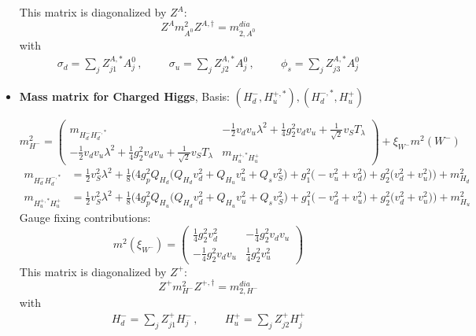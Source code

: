 \begin{itemize}
This matrix is diagonalized by \(Z^A\): 
\begin{equation} 
Z^A m^2_{A^0} Z^{A,\dagger} = m^{dia}_{2,A^0} 
\end{equation} 
with 
\begin{align} 
\sigma_{d} = \sum_{j}Z^{A,*}_{j 1}A^0_{{j}}\,, \hspace{1cm} 
\sigma_{u} = \sum_{j}Z^{A,*}_{j 2}A^0_{{j}}\,, \hspace{1cm} 
\phi_s = \sum_{j}Z^{A,*}_{j 3}A^0_{{j}}
\end{align} 
\item {\bf Mass matrix for Charged Higgs}, Basis: \( \left(H_d^-, H_u^{+,*}\right), \left(H_d^{-,*}, H_u^+\right) \) 
 
\begin{equation} 
m^2_{H^-} = \left( 
\begin{array}{cc}
m_{H_d^-H_d^{-,*}} &-\frac{1}{2} v_d v_u \lambda^{2}  + \frac{1}{4} g_{2}^{2} v_d v_u  + \frac{1}{\sqrt{2}} v_S T_{\lambda} \\ 
-\frac{1}{2} v_d v_u \lambda^{2}  + \frac{1}{4} g_{2}^{2} v_d v_u  + \frac{1}{\sqrt{2}} v_S T_{\lambda}  &m_{H_u^{+,*}H_u^+}\end{array} 
\right) +  \xi_{W^-}m^2(W^-) 
 \end{equation} 
\begin{align} 
m_{H_d^-H_d^{-,*}} &= \frac{1}{2} v_{S}^{2} \lambda^{2}  + \frac{1}{8} \Big(4 g_{p}^{2} Q_{H_d} \Big(Q_{H_d} v_{d}^{2}  + Q_{H_u} v_{u}^{2}  + Q_s v_{S}^{2} \Big) + g_{1}^{2} \Big(- v_{u}^{2}  + v_{d}^{2}\Big) + g_{2}^{2} \Big(v_{d}^{2} + v_{u}^{2}\Big)\Big) + m_{H_d}^2\\ 
m_{H_u^{+,*}H_u^+} &= \frac{1}{2} v_{S}^{2} \lambda^{2}  + \frac{1}{8} \Big(4 g_{p}^{2} Q_{H_u} \Big(Q_{H_d} v_{d}^{2}  + Q_{H_u} v_{u}^{2}  + Q_s v_{S}^{2} \Big) + g_{1}^{2} \Big(- v_{d}^{2}  + v_{u}^{2}\Big) + g_{2}^{2} \Big(v_{d}^{2} + v_{u}^{2}\Big)\Big) + m_{H_u}^2
\end{align} 
Gauge fixing contributions: 
\begin{equation} 
m^2 (\xi_{W^-}) = \left( 
\begin{array}{cc}
\frac{1}{4} g_{2}^{2} v_{d}^{2}  &-\frac{1}{4} g_{2}^{2} v_d v_u \\ 
-\frac{1}{4} g_{2}^{2} v_d v_u  &\frac{1}{4} g_{2}^{2} v_{u}^{2} \end{array} 
\right) 
 \end{equation} 
This matrix is diagonalized by \(Z^+\): 
\begin{equation} 
Z^+ m^2_{H^-} Z^{+,\dagger} = m^{dia}_{2,H^-} 
\end{equation} 
with 
\begin{align} 
H_d^- = \sum_{j}Z_{{j 1}}^{+}H^-_{{j}}\,, \hspace{1cm} 
H_u^+ = \sum_{j}Z_{{j 2}}^{+}H^+_{{j}}
\end{align} 
\end{itemize} 
